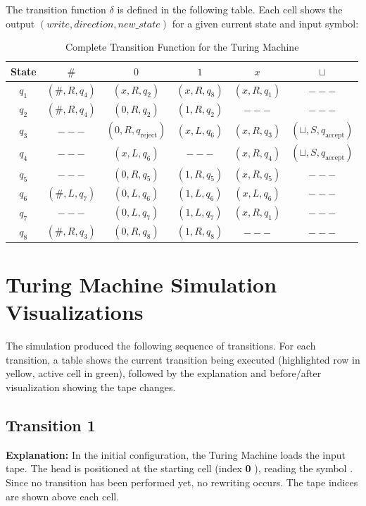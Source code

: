 \documentclass{article}
\begin{document}
The transition function $\delta$ is defined in the following table. Each cell shows the output $(write, direction, new\_state)$ for a given current state and input symbol:

\begin{table}[htbp]
\centering
\small
\begin{tabular}{|c|c|c|c|c|c|}
\hline
\textbf{State} & \textbf{ $\#$ } & \textbf{ $0$ } & \textbf{ $1$ } & \textbf{ $x$ } & \textbf{ $\sqcup$ } \\ \hline
$q_{1}$ & $(\#, R, q_{4})$ & $(x, R, q_{2})$ & $(x, R, q_{8})$ & $(x, R, q_{1})$ & $---$ \\ \hline
$q_{2}$ & $(\#, R, q_{4})$ & $(0, R, q_{2})$ & $(1, R, q_{2})$ & $---$ & $---$ \\ \hline
$q_{3}$ & $---$ & $(0, R, q_{\text{reject}})$ & $(x, L, q_{6})$ & $(x, R, q_{3})$ & $(\sqcup, S, q_{\text{accept}})$ \\ \hline
$q_{4}$ & $---$ & $(x, L, q_{6})$ & $---$ & $(x, R, q_{4})$ & $(\sqcup, S, q_{\text{accept}})$ \\ \hline
$q_{5}$ & $---$ & $(0, R, q_{5})$ & $(1, R, q_{5})$ & $(x, R, q_{5})$ & $---$ \\ \hline
$q_{6}$ & $(\#, L, q_{7})$ & $(0, L, q_{6})$ & $(1, L, q_{6})$ & $(x, L, q_{6})$ & $---$ \\ \hline
$q_{7}$ & $---$ & $(0, L, q_{7})$ & $(1, L, q_{7})$ & $(x, R, q_{1})$ & $---$ \\ \hline
$q_{8}$ & $(\#, R, q_{3})$ & $(0, R, q_{8})$ & $(1, R, q_{8})$ & $---$ & $---$ \\ \hline
\end{tabular}
\caption{Complete Transition Function for the Turing Machine}
\end{table}

\section{Turing Machine Simulation Visualizations}

The simulation produced the following sequence of transitions. For each transition, a table shows the current transition being executed (highlighted row in yellow, active cell in green), followed by the explanation and before/after visualization showing the tape changes.
\subsection*{Transition 1}

\textbf{Explanation:}
In the initial configuration, the Turing Machine loads the input tape. The head is positioned at the starting cell (index \textbf{ 0 }), reading the symbol . Since no transition has been performed yet, no rewriting occurs. The tape indices are shown above each cell.
\end{document}
